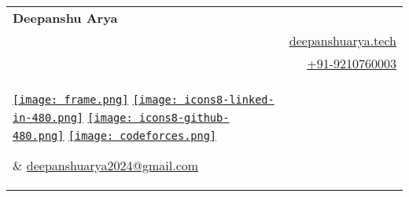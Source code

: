 \documentclass[a4paper,11pt]{article}
\makeatletter
\newcommand{\name}{Deepanshu Arya} %
\newcommand{\phone}{9210760003} %
\newcommand{\emaila}{deepanshuarya2024@gmail.com} %
\makeatother
\begin{document}



\parbox{\dimexpr\linewidth-2.8cm\relax}{
	\vspace{8mm}
	\begin{tabularx}{\linewidth}{l r}  %
		\textbf{\huge \name} & \\  %
		{} & \raisebox{0.0\height}{\footnotesize \faLink} \href{https://deepanshuarya.tech/}{deepanshuarya.tech} \\
		{} & \raisebox{0.0\height}{\footnotesize \faPhone} \href{callto:+91-\phone}{+91-\phone} \\  %
		\parbox{12cm}{  %
			\flushleft
			\vspace{-16mm}  %
			\href{https://deepanshuarya.tech/}{\texttt{[image: frame.png]}}
			\hspace{0.5em}
			\href{https://www.linkedin.com/in/deepanshuarya2024/}{\texttt{[image: icons8-linked-in-480.png]}}
			\hspace{0.5em}
			\href{https://github.com/sudo-arya/}{\texttt{[image: icons8-github-480.png]}}
			\hspace{0.5em}
			\href{https://codeforces.com/profile/TLE_lord}{\texttt{[image: codeforces.png]}}
			
		} & \href{mailto:\emaila}{\raisebox{0.0\height}{\footnotesize \faEnvelope} \emaila} \\
	\end{tabularx}
}

\vspace{-6.5mm}


\end{document}
